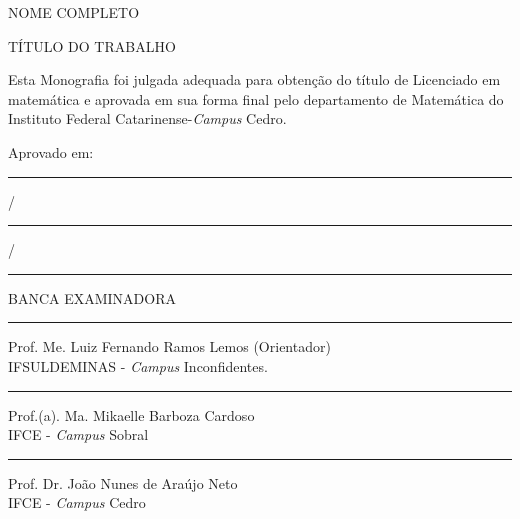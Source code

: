 
\begin{titlepage}
    \begin{center}
		
		\vspace{0.5cm}		
		NOME COMPLETO
		\vspace{0.5cm}
	\end{center}

		
	\begin{center}		
		\vspace{1cm}
		{\large {TÍTULO DO TRABALHO\\}}
		
		\vspace{3cm}
	\end{center}
	
	\begin{flushright}
	\begin{minipage}[l]{8cm}
	Esta Monografia foi julgada adequada para obtenção do título de Licenciado em matemática e aprovada em sua forma final pelo departamento de Matemática do Instituto Federal Catarinense-\textit{Campus} Cedro.
	
		\end{minipage}
\end{flushright}
			\vspace{3cm}

	Aprovado em: \rule{1.5cm}{0.1mm} / \rule{1.5cm}{0.1mm} / \rule{1.5cm}{0.1mm}
	
	\vspace{1.5cm}
	\begin{center}
	 	BANCA EXAMINADORA
	\end{center}
		
	\vspace{0.7cm}
	\begin{center}
		
		\rule{11cm}{0.1mm}
		
		Prof. Me. Luiz Fernando Ramos Lemos (Orientador)\\
		IFSULDEMINAS - \textit{Campus} Inconfidentes.
		
		
		\vspace{0.8cm}
		
		\rule{11cm}{0.1mm}
		
		Prof.(a). Ma. Mikaelle Barboza Cardoso\\
		IFCE - \textit{Campus} Sobral
		
		
		\vspace{0.8cm}
		\rule{11cm}{0.1mm}
		
		Prof. Dr. João Nunes de Araújo Neto\\
		IFCE - \textit{Campus} Cedro

		\vspace{3cm}
		

		

		
	\end{center}
	 \vfill
	 \centering
		
\end{titlepage}

